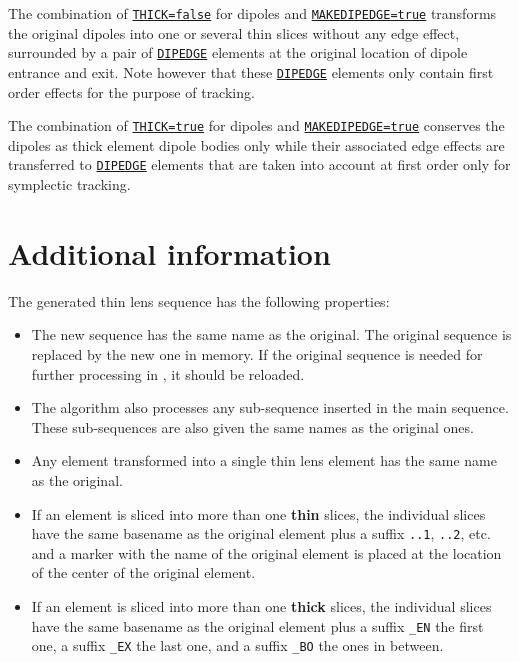 The combination of \hyperref[sec:numberofslices]{\texttt{THICK=false}}
for dipoles and \hyperref[sec:makethin]{\texttt{MAKEDIPEDGE=true}} 
transforms the original dipoles into one or several thin slices without 
any edge effect, surrounded by a pair of
\hyperref[sec:dipedge]{\texttt{DIPEDGE}}  
elements at the original location of dipole entrance and exit. 
Note however that these \hyperref[sec:dipedge]{\texttt{DIPEDGE}}
elements only contain first order effects for the purpose of tracking. 

The combination of \hyperref[sec:numberofslices]{\texttt{THICK=true}}
for dipoles and \hyperref[sec:makethin]{\texttt{MAKEDIPEDGE=true}} 
conserves the dipoles as thick element dipole bodies only while their
associated edge effects are transferred to
\hyperref[sec:dipedge]{\texttt{DIPEDGE}} elements that are taken into
account at first order only for symplectic tracking. 

\section{Additional information}

The generated thin lens sequence has the following properties: 
\begin{itemize}
\item The new sequence has the same name as the original. 
  The original sequence is replaced by the new one in memory. 
  If the original sequence is needed for further processing in \madx, 
  it should be reloaded.
\item The algorithm also processes any sub-sequence inserted in the main
  sequence. These sub-sequences are also given the same names as the
  original ones. 
\item Any element transformed into a single thin lens element has the
  same name as the original. 
\item If an element is sliced into more than one \textbf{thin} slices, the individual
  slices have the same basename as the original element plus a suffix 
  \texttt{..1}, \texttt{..2}, etc. and a marker with the name of the
  original element is placed at the location of the center of the
  original element. 
\item If an element is sliced into more than one \textbf{thick} slices, the individual
  slices have the same basename as the original element plus a suffix \texttt{\_EN} the first one, a suffix \texttt{\_EX} the last one, and a suffix \texttt{\_BO} the ones in between.
\end{itemize}


